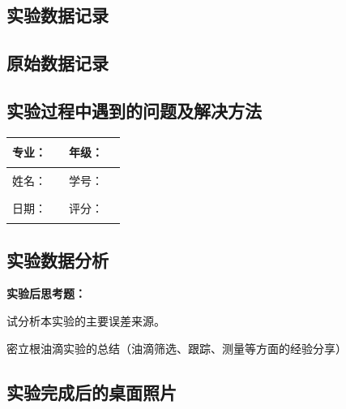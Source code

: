 \documentclass[dvipsnames, svgnames,a4paper,11pt]{article}
\newcommand{\recordblank}[1]{\par\vspace*{#1}\par}
\begin{document}
\subsection{实验数据记录}
\recordblank{5.0cm}
\subsection{原始数据记录}
\recordblank{18cm}
\clearpage
\recordblank{18cm}
\clearpage
\recordblank{10.1cm}
\subsection{实验过程中遇到的问题及解决方法}
\recordblank{5.0cm}
\clearpage
\noindent\begin{minipage}{\textwidth}
	\renewcommand\arraystretch{1.7}
	\begin{tabularx}{\textwidth}{|X|X|X|X|}
	\hline
	专业：& \rule{2.5cm}{0.4pt} & 年级：& \rule{2.5cm}{0.4pt}\\
	\hline
	姓名：& \rule{2.5cm}{0.4pt} & 学号：& \rule{2.5cm}{0.4pt}\\
	\hline
	日期：& \rule{2.5cm}{0.4pt} & 评分：& \rule{2.5cm}{0.4pt}\\
	\hline
	\end{tabularx}
\vspace{0.8em}
\subsection{实验数据分析}
\recordblank{3.5cm}
\end{minipage}

\textbf{实验后思考题：}
\begin{question}
试分析本实验的主要误差来源。
\end{question}
\recordblank{4cm}
\clearpage
\begin{question}
密立根油滴实验的总结（油滴筛选、跟踪、测量等方面的经验分享）
\end{question}
\recordblank{4cm}

\clearpage
% 
% 

\clearpage
\appendix
\appendixpage
\addappheadtotoc

\subsection{实验完成后的桌面照片}
\end{document}
